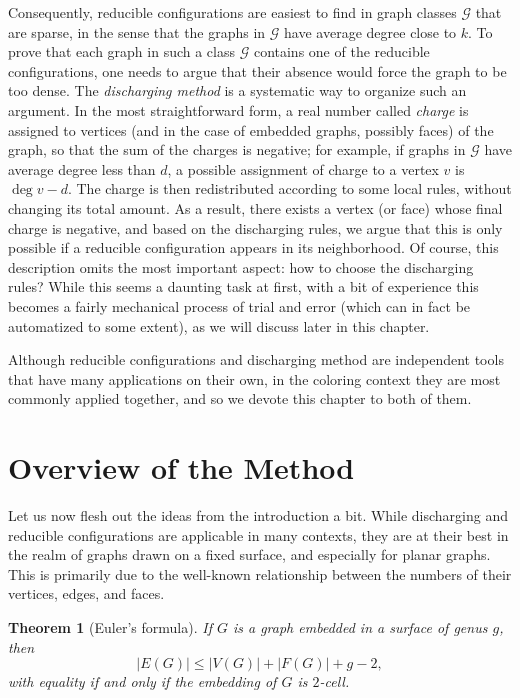 \documentclass[12pt,twoside,openright,a4paper]{book}
\newtheorem{theorem}{Theorem}[chapter]
\newcommand{\GG}{\mathcal{G}}
\begin{document}
Consequently, reducible configurations are easiest to find in graph classes $\GG$ that are sparse, in the
sense that the graphs in $\GG$ have average degree close to $k$. To prove that each graph in such a class $\GG$
contains one of the reducible configurations, one needs to argue that their absence would force the graph to be
too dense.  The \emph{discharging method} is a systematic way to organize such an argument.  In the most straightforward
form, a real number called \emph{charge} is assigned to vertices (and in the case of embedded graphs, possibly faces)
of the graph, so that the sum of the charges is negative; for example, if graphs in $\GG$ have average degree less than $d$,
a possible assignment of charge to a vertex $v$ is $\deg v-d$.  The charge is then redistributed according to some local
rules, without changing its total amount.  As a result, there exists a vertex (or face) whose final charge is negative,
and based on the discharging rules, we argue that this is only possible if a reducible configuration appears in its neighborhood.
Of course, this description omits the most important aspect: how to choose the discharging rules?
While this seems a daunting task at first, with a bit of experience this becomes a fairly mechanical process of trial and error
(which can in fact be automatized to some extent), as we will discuss later in this chapter.

Although reducible configurations and discharging method are independent tools that have many applications on their
own, in the coloring context they are most commonly applied together, and so we devote this chapter to both of them.

\section{Overview of the Method}

Let us now flesh out the ideas from the introduction a bit.  While discharging and reducible configurations
are applicable in many contexts, they are at their best in the realm of graphs drawn on a fixed surface, and
especially for planar graphs.  This is primarily due to the well-known relationship between the numbers
of their vertices, edges, and faces.

\begin{theorem}[Euler's formula]\label{thm:eulerfla}
If $G$ is a graph embedded in a surface of genus $g$, then
$$|E(G)|\le |V(G)|+|F(G)|+g-2,$$
with equality if and only if the embedding of $G$ is $2$-cell.
\end{theorem}
\end{document}
